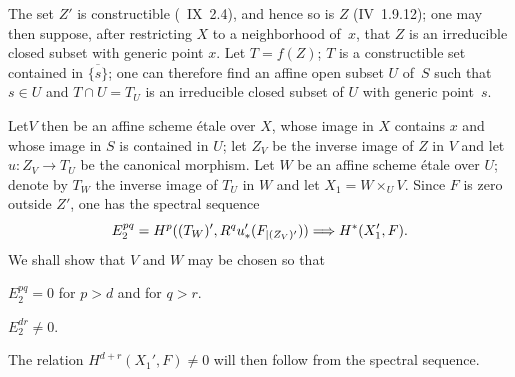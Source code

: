 The set $Z'$ is constructible (~IX~2.4), and hence so is $Z$ (\EGA IV~1.9.12); one may then suppose, after restricting $X$ to a neighborhood of~$x$, that $Z$ is an irreducible closed subset with generic point $x$. Let $T=f(Z)$; $T$ is a constructible set contained in $\overline{\{s\}}$; one can therefore find an affine open subset $U$ of~$S$ such that $s \in U$ and $T \cap U = T_U$ is an irreducible closed subset of $U$ with generic point~$s$.

Let\pageoriginale $V$ then be an affine scheme \'{e}tale over $X$, whose image in $X$ contains $x$ and whose image in $S$ is contained in $U$; let $Z_V$ be the inverse image of $Z$ in $V$ and let $u: Z_V \to T_U$ be the canonical morphism. Let\sisi{}{} $W$ be an affine scheme \'{e}tale over $U$; denote by $T_W$ the inverse image of $T_U$ in $W$ and let $X_1 = W\times_U V$. Since $F$ is zero outside $Z'$, one has the spectral sequence
$$
E^{pq}_2 = H^p((T_W)', R^qu_*'(F_{|(Z_V)'})) \Longrightarrow H^*(X'_1, F).
$$
We shall show that $V$ and $W$ may be chosen so that
\begin{enumeratea}
\item
$E^{pq}_2=0$ for $p>d$ and for $q>r$.
\item
$E^{dr}_2 \neq 0$.
\end{enumeratea}
\noindent
The relation $H^{d+r}(X_1', F) \neq 0$ will then follow from the spectral sequence.
